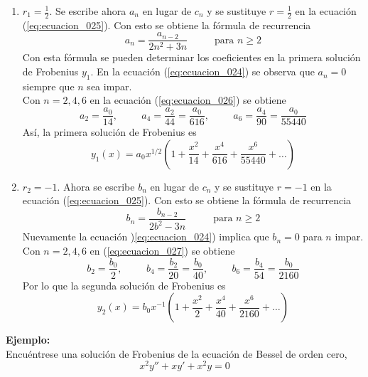 \begin{enumerate}[C{a}so 1.]
\item $r_{1}= \frac{1}{2}$. Se escribe ahora $a_{n}$ en lugar de $c_{n}$ y se sustituye $r = \frac{1}{2}$  en la ecuación (\ref{eq:ecuacion_025}). Con esto se obtiene la fórmula de recurrencia
\begin{equation}
a_{n} =  \dfrac{a_{n-2}}{2 n^{2} + 3n} \hspace{1cm} \mbox{ para } n \geq 2
\label{eq:ecuacion_026}
\end{equation}
Con esta fórmula se pueden determinar los coeficientes en la primera solución de Frobenius $y_{1}$. En la ecuación (\ref{eq:ecuacion_024}) se observa que $a_{n} = 0$ siempre que $n$ sea impar.
\\
Con $n = 2, 4, 6$ en la ecuación (\ref{eq:ecuacion_026}) se obtiene
\[ a_{2} = \dfrac{a_{0}}{14}, \hspace{1cm} a_{4} = \dfrac{a_{2}}{44} = \dfrac{a_{0}}{616}, \hspace{1cm} a_{6} = \dfrac{a_{4}}{90} = \dfrac{a_{0}}{55440} \]
Así, la primera solución de Frobenius es
\[ y_{1}(x) = a_{0} x^{1/2} \left( 1 + \dfrac{x^{2}}{14} + \dfrac{x^{4}}{616} + \dfrac{x^{6}}{55440} + \ldots \right)  \]
\item $r_{2} = -1$. Ahora se escribe $b_{n}$ en lugar de $c_{n}$ y se sustituye $r = -1$ en la ecuación (\ref{eq:ecuacion_025}). Con esto se obtiene la fórmula de recurrencia
\begin{equation}
b_{n} = \dfrac{b_{n-2}}{2 b^{2} - 3n} \hspace{1cm} \mbox{ para } n \geq 2
\label{eq:ecuacion_027}
\end{equation}
Nuevamente la ecuación )\ref{eq:ecuacion_024}) implica que $b_{n}=0$ para $n$ impar. Con $n = 2,4,6$ en (\ref{eq:ecuacion_027}) se obtiene
\[ b_{2} = \dfrac{b_{0}}{2}, \hspace{1cm} b_{4} = \dfrac{b_{2}}{20} = \dfrac{b_{0}}{40}, \hspace{1cm} b_{6} = \dfrac{b_{4}}{54} = \dfrac{b_{0}}{2160} \]
Por lo que la segunda solución de Frobenius es
\[ y_{2}(x) = b_{0} x^{-1} \left( 1 + \dfrac{x^{2}}{2} + \dfrac{x^{4}}{40} + \dfrac{x^{6}}{2160} + \ldots \right) \]
\end{enumerate}
\textbf{Ejemplo:}
\\
Encuéntrese una solución de Frobenius de la ecuación de Bessel de orden cero,
\begin{equation}
x^{2} y'' + x y' + x^{2} y = 0
\label{eq:ecuacion_028}
\end{equation}

